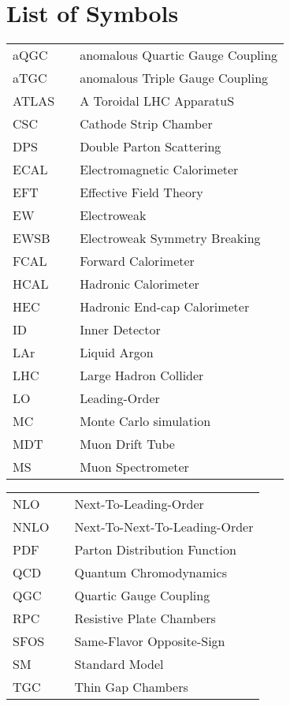 \chapter*{List of Symbols}
  \begin{tabular}{lp{}p{}}
    aQGC        & \dotfill & anomalous Quartic Gauge Coupling \\
    aTGC         & \dotfill & anomalous Triple Gauge Coupling \\
    ATLAS       & \dotfill & A Toroidal LHC ApparatuS \\
    CSC         & \dotfill & Cathode Strip Chamber \\
    DPS         & \dotfill & Double Parton Scattering \\
    ECAL        & \dotfill & Electromagnetic Calorimeter \\
    EFT         & \dotfill & Effective Field Theory \\
    EW          & \dotfill & Electroweak \\
    EWSB        & \dotfill & Electroweak Symmetry Breaking \\
    FCAL        & \dotfill & Forward Calorimeter \\
    HCAL        & \dotfill & Hadronic Calorimeter \\
    HEC         & \dotfill & Hadronic End-cap Calorimeter \\
    ID          & \dotfill & Inner Detector \\
    LAr         & \dotfill & Liquid Argon \\
    LHC         & \dotfill & Large Hadron Collider \\
    LO          & \dotfill & Leading-Order \\
    MC          & \dotfill & Monte Carlo simulation \\
    MDT         & \dotfill & Muon Drift Tube \\
    MS          & \dotfill & Muon Spectrometer \\
  \end{tabular}

  \begin{tabular}{lp{}p{}}
    NLO         & \dotfill & Next-To-Leading-Order \\
    NNLO         & \dotfill & Next-To-Next-To-Leading-Order \\
    PDF         & \dotfill & Parton Distribution Function \\
    QCD         & \dotfill & Quantum Chromodynamics \\
    QGC         & \dotfill & Quartic Gauge Coupling \\
    RPC         & \dotfill & Resistive Plate Chambers \\
    SFOS        & \dotfill & Same-Flavor Opposite-Sign \\
    SM          & \dotfill & Standard Model  \\
    TGC         & \dotfill & Thin Gap Chambers \\

  \end{tabular}


